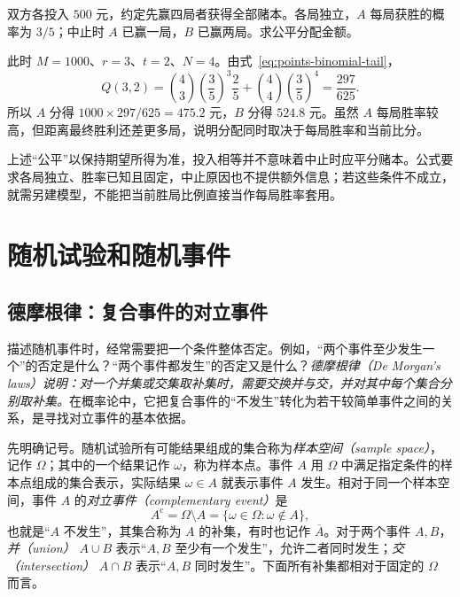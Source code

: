 \documentclass[UTF8,12pt,a4paper,fontset=fandol]{ctexbook}
\begin{document}
\begin{example}
\label{ex:points-biased}
双方各投入 $500$ 元，约定先赢四局者获得全部赌本。各局独立，$A$ 每局获胜的概率为 $3/5$；中止时 $A$ 已赢一局，$B$ 已赢两局。求公平分配金额。
\end{example}

\begin{solve}
此时 $M=1000$、$r=3$、$t=2$、$N=4$。由式~\eqref{eq:points-binomial-tail}，
\[
  Q(3,2)=\binom43\left(\frac35\right)^3\frac25
          +\binom44\left(\frac35\right)^4
        =\frac{297}{625}.
\]
所以 $A$ 分得 $1000\times297/625=475.2$ 元，$B$ 分得 $524.8$ 元。虽然 $A$ 每局胜率较高，但距离最终胜利还差更多局，说明分配同时取决于每局胜率和当前比分。
\end{solve}

上述“公平”以保持期望所得为准，投入相等并不意味着中止时应平分赌本。公式要求各局独立、胜率已知且固定，中止原因也不提供额外信息；若这些条件不成立，就需另建模型，不能把当前胜局比例直接当作每局胜率套用。

\section{随机试验和随机事件}
\label{sec:study-random-experiments}

\subsection{德摩根律：复合事件的对立事件}
\label{subsec:study-de-morgan}

描述随机事件时，经常需要把一个条件整体否定。例如，“两个事件至少发生一个”的否定是什么？“两个事件都发生”的否定又是什么？\emph{\emph{德摩根律（De Morgan's laws）}说明：对一个并集或交集取补集时，需要交换并与交，并对其中每个集合分别取补集。}在概率论中，它把复合事件的“不发生”转化为若干较简单事件之间的关系，是寻找对立事件的基本依据。

先明确记号。随机试验所有可能结果组成的集合称为\emph{样本空间（sample space）}，记作 $\Omega$；其中的一个结果记作 $\omega$，称为样本点。事件 $A$ 用 $\Omega$ 中满足指定条件的样本点组成的集合表示，实际结果 $\omega\in A$ 就表示事件 $A$ 发生。相对于同一个样本空间，事件 $A$ 的\emph{对立事件（complementary event）}是
\[
  A^{\mathrm c}=\Omega\setminus A
  =\{\omega\in\Omega:\omega\notin A\},
\]
也就是“$A$ 不发生”，其集合称为 $A$ 的补集，有时也记作 $\overline A$。对于两个事件 $A,B$，\emph{并（union）} $A\cup B$ 表示“$A,B$ 至少有一个发生”，允许二者同时发生；\emph{交（intersection）} $A\cap B$ 表示“$A,B$ 同时发生”。下面所有补集都相对于固定的 $\Omega$ 而言。
\end{document}
